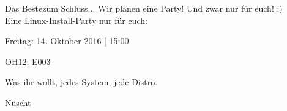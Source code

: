 \begin{frame}{Das Beste}{zum Schluss...}
	Wir planen eine Party! Und zwar nur für euch! :)\\
	Eine Linux-Install-Party nur für euch:\\
	\begin{center}
	\begin{description}[<+->]
		\item[Wann?] Freitag: 14. Oktober 2016 | 15:00
		\item[Wo?] OH12: E003
		\item[Was?] Was ihr wollt, jedes System, jede Distro.
		\item[Koscht?] Nüscht
	\end{description}
	\end{center}
\end{frame}
